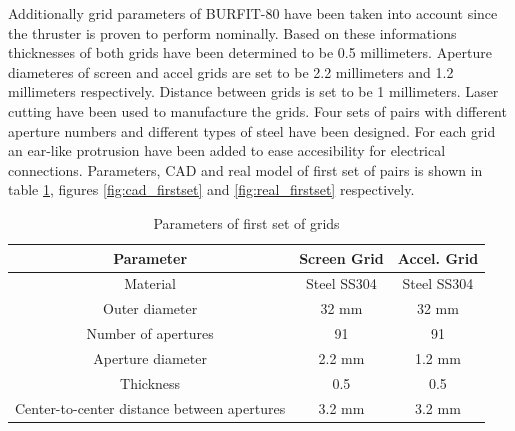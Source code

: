 Additionally grid parameters of BURFIT-80 have been taken into account since the thruster is proven to perform nominally. Based on these informations thicknesses of both grids have been determined to be 0.5 millimeters. Aperture diameteres of screen and accel grids are set to be 2.2 millimeters and 1.2 millimeters respectively. Distance between grids is set to be 1 millimeters.
\newpage
Laser cutting have been used to manufacture the grids. Four sets of pairs with different aperture numbers and different types of steel have been designed. For each grid an ear-like protrusion have been added to ease accesibility for electrical connections. Parameters, CAD and real model of first set of pairs is shown in table \ref{table:params_firstset}, figures \ref{fig:cad_firstset} and \ref{fig:real_firstset} respectively.

\begin{table}[ht]
    \centering
    \begin{tabular}{||c|c|c||}
        \hline
        \textbf{Parameter} & \textbf{Screen Grid} & \textbf{Accel. Grid} \\
        \hline
        Material & Steel SS304 & Steel SS304 \\
        \hline
        Outer diameter & 32 mm & 32 mm \\
        \hline
        Number of apertures & 91 & 91 \\
        \hline
        Aperture diameter & 2.2 mm & 1.2 mm \\
        \hline
        Thickness & 0.5 & 0.5 \\
        \hline
        Center-to-center distance between apertures & 3.2 mm & 3.2 mm \\
        \hline      
    \end{tabular}
\caption{Parameters of first set of grids}
\label{table:params_firstset}
\end{table}

